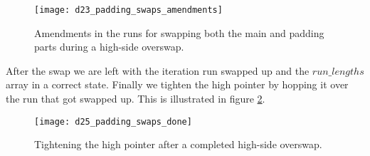 \begin{figure}[H]
  \centering
  \texttt{[image: d23\_padding\_swaps\_amendments]}
  \caption{Amendments in the runs for swapping both the main and padding parts during a high-side overswap.}
  \label{fig:padding_swaps_amendments}
\end{figure}

After the swap we are left with the iteration run swapped up and the $run\_lengths$ array in a correct state. Finally we tighten the high pointer by hopping it over the run that got swapped up. This is illustrated in figure \ref{fig:padding_swaps_done}.

\begin{figure}[H]
  \centering
  \texttt{[image: d25\_padding\_swaps\_done]}
  \caption{Tightening the high pointer after a completed high-side overswap.}
  \label{fig:padding_swaps_done}
\end{figure}